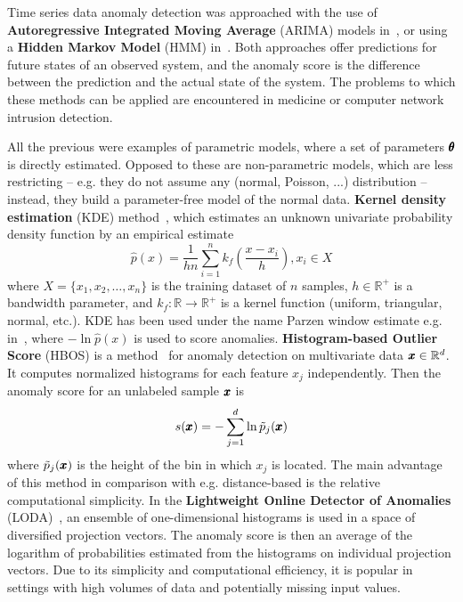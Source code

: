 Time series data anomaly detection was approached with the use of \textbf{Autoregressive Integrated Moving Average} (ARIMA) models in~\cite{roberts1994probabilistic,hoare2002line}, or using a \textbf{Hidden Markov Model} (HMM) in~\cite{yeung2003host,zhang2003new}. Both approaches offer predictions for future states of an observed system, and the anomaly score is the difference between the prediction and the actual state of the system. The problems to which these methods can be applied are encountered in medicine or computer network intrusion detection.

All the previous were examples of parametric models, where a set of parameters $\pmb{{\theta}}$ is directly estimated. Opposed to these are non-parametric models, which are less restricting  -- e.g. they do not assume any (normal, Poisson, ...) distribution -- instead, they build a parameter-free model of the normal data. \textbf{Kernel density estimation} (KDE) method~\cite{parzen1962estimation}, which estimates an unknown univariate probability density function by an empirical estimate
\begin{equation} \label{eq:kde}
	\hat{p}(x) = \frac{1}{hn} \sum_{i=1}^n k_f \left( \frac{x-x_i}{h} \right), x_i \in X
\end{equation}
where $X = \lbrace x_1, x_2, \ldots, x_n \rbrace$ is the training dataset of $n$ samples, $h \in \mathbb{R}^+$ is a bandwidth parameter, and $k_f:\mathbb{R} \rightarrow \mathbb{R}^+$ is a kernel function (uniform, triangular, normal, etc.). KDE has been used under the name Parzen window estimate e.g. in~\cite{tarassenko1995novelty,yeung2002parzen}, where $-\ln \hat{p}(x)$ is used to score anomalies. \textbf{Histogram-based Outlier Score} (HBOS) is a method~\cite{goldstein2012histogram} for anomaly detection on multivariate data $\pmb{{x}} \in \mathbb{R}^d$. It computes normalized histograms for each feature $x_j$ independently. Then the anomaly score for an unlabeled sample $\pmb{{x}}$ is
\begin{equation} \label{eq:hbos}
	s(\pmb{{x}}) =  -\sum_{j=1}^d \ln \tilde{p}_j(\pmb{{x}})
\end{equation}
where $\tilde{p}_j(\pmb{{x}})$ is the height of the bin in which $x_j$ is located. The main advantage of this method in comparison with e.g. distance-based is the relative computational simplicity. In the \textbf{Lightweight Online Detector of Anomalies} (LODA)~\cite{pevny2016loda}, an ensemble of one-dimensional histograms is used in a space of diversified projection vectors. The anomaly score is then an average of the logarithm of probabilities estimated from the histograms on individual projection vectors. Due to its simplicity and computational efficiency, it is popular in settings with high volumes of data and potentially missing input values.

